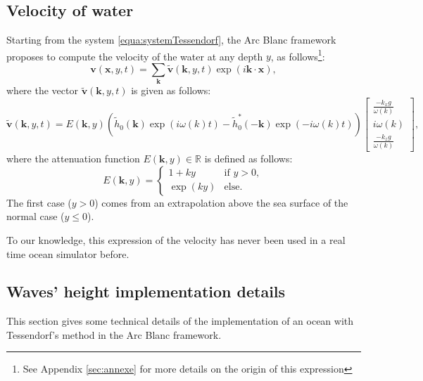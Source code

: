 \documentclass[11pt]{article}
\def\framework{the Arc Blanc framework\xspace}
\begin{document}
\subsection{Velocity of water}
\label{subsec:velWater}
Starting from the system \ref{equa:systemTessendorf}, \framework proposes to compute the velocity of the water at any depth $y$, as follows\footnote{See Appendix   \ref{sec:annexe} for more details on the origin of this expression}:
\begin{equation}\label{equa:velocity}
	\mathbf v(\mathbf x,y,t)=
	\sum_{\mathbf{k}} \tilde{\mathbf{v}}(\mathbf{k}, y, t)\exp\left(i\mathbf{k}\cdot\mathbf x\right),
\end{equation}
where the vector $\tilde{\mathbf{v}}(\mathbf{k}, y, t)$ is given as follows:
\begin{equation}
	\tilde{\mathbf{v}}\left(\mathbf{k}, y, t\right)=%
	E\left(\mathbf{k},y\right)\left(\tilde{h}_0\left(\mathbf{k}\right)\exp\left({i\omega(k)t}\right)-\tilde{h}_0^*\left(-\mathbf{k}\right)\exp\left({-i\omega(k)t}\right)\right)
	\left[
		\begin{array}{c}
			\displaystyle\frac{-k_xg}{\omega(k)} \\
			\displaystyle i\omega(k)             \\
			\displaystyle\frac{-k_zg}{\omega(k)}
		\end{array}
		\right],
\end{equation}
where the attenuation function $E(\mathbf{k},y)\in\mathbb R$ is defined as follows:
\begin{equation}
	\label{equa:attenuationDeep}
	E(\mathbf{k}, y)=
	\begin{cases}
		1+ky     & \text{if }y>0, \\
		\exp(ky) & \text{else}.
	\end{cases}
\end{equation}
The first case ($y>0$) comes from an extrapolation above the sea surface of the normal case ($y\leq0$).

To our knowledge, this expression of the velocity has never been used in a real time ocean simulator before.

\subsection{Waves' height implementation details}
This section gives some technical details of the implementation of an ocean with Tessendorf's method in \framework.
\end{document}
